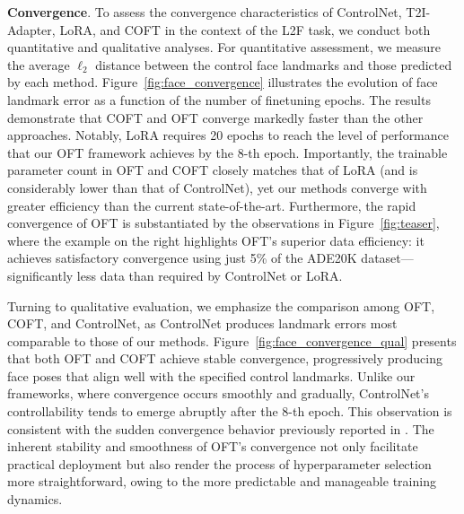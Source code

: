 {\textbf{Convergence}. To assess the convergence characteristics of ControlNet, T2I-Adapter, LoRA, and COFT in the context of the L2F task, we conduct both quantitative and qualitative analyses. For quantitative assessment, we measure the average $\ell_2$ distance between the control face landmarks and those predicted by each method. Figure~\ref{fig:face_convergence} illustrates the evolution of face landmark error as a function of the number of finetuning epochs. The results demonstrate that COFT and OFT converge markedly faster than the other approaches. Notably, LoRA requires 20 epochs to reach the level of performance that our OFT framework achieves by the 8-th epoch. Importantly, the trainable parameter count in OFT and COFT closely matches that of LoRA (and is considerably lower than that of ControlNet), yet our methods converge with greater efficiency than the current state-of-the-art. Furthermore, the rapid convergence of OFT is substantiated by the observations in Figure~\ref{fig:teaser}, where the example on the right highlights OFT’s superior data efficiency: it achieves satisfactory convergence using just 5\% of the ADE20K dataset—significantly less data than required by ControlNet or LoRA. 

Turning to qualitative evaluation, we emphasize the comparison among OFT, COFT, and ControlNet, as ControlNet produces landmark errors most comparable to those of our methods. Figure~\ref{fig:face_convergence_qual} presents that both OFT and COFT achieve stable convergence, progressively producing face poses that align well with the specified control landmarks. Unlike our frameworks, where convergence occurs smoothly and gradually, ControlNet’s controllability tends to emerge abruptly after the 8-th epoch. This observation is consistent with the sudden convergence behavior previously reported in \cite{zhang2023adding}. The inherent stability and smoothness of OFT’s convergence not only facilitate practical deployment but also render the process of hyperparameter selection more straightforward, owing to the more predictable and manageable training dynamics.

}
